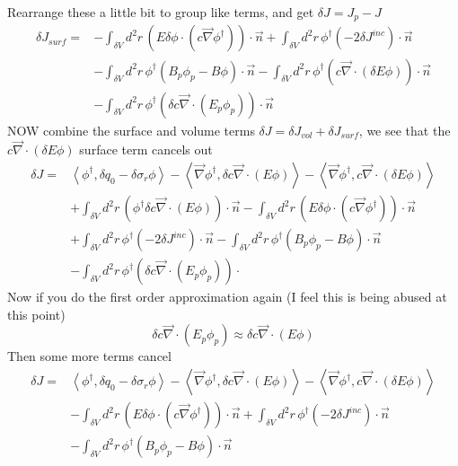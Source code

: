 \documentclass{article}
\newcommand{\bra}{\left\langle}
\newcommand{\ket}{\right\rangle}
\newcommand{\vdiv}{\vec{\nabla} \cdot}
\newcommand{\vgrad}{\vec{\nabla}}
\begin{document}
Rearrange these a little bit to group like terms, and get $\delta J = J_p -J$
\begin{align*}
\delta J_{surf} =& - \int_{\delta V} d^2 r \, \left( E \delta \phi \cdot \left( c  \vgrad \phi^\dag \right)\right) \cdot \vec{n} + \int_{\delta V} d^2 r \, \phi^\dag \left(-2\delta J^{inc} \right) \cdot \vec{n} \\
&- \int_{\delta V} d^2 r \, \phi^\dag \left( B_p \phi_p - B \phi \right) \cdot \vec{n} - \int_{\delta V} d^2 r \, \phi^\dag \left( c \vdiv \left( \delta E \phi \right) \right) \cdot \vec{n} \\
&- \int_{\delta V} d^2 r \, \phi^\dag \left( \delta c \vdiv \left( E_p \phi_p \right) \right) \cdot \vec{n}
\end{align*}
NOW combine the surface and volume terms $\delta J = \delta J_{vol} + \delta J_{surf}$, we see that the $c \vdiv \left( \delta E \phi \right)$ surface term cancels out
\begin{align*}
\delta J =& \bra \phi^\dag , \delta q_0 - \delta \sigma_r \phi \ket -  \bra \vgrad \phi^\dag ,  \delta c \vdiv \left( E \phi  \right) \ket - \bra \vgrad \phi^\dag ,  c \vdiv \left( \delta E \phi \right)   \ket \\
&+ \int_{\delta V} d^2 r \, \left( \phi^\dag \delta c \vdiv \left( E \phi \right) \right) \cdot \vec{n} 
- \int_{\delta V} d^2 r \, \left( E \delta \phi \cdot \left( c  \vgrad \phi^\dag \right)\right) \cdot \vec{n} \\
&+ \int_{\delta V} d^2 r \, \phi^\dag \left(-2\delta J^{inc} \right) \cdot \vec{n} 
- \int_{\delta V} d^2 r \, \phi^\dag \left( B_p \phi_p - B \phi \right) \cdot \vec{n}  \\
&- \int_{\delta V} d^2 r \, \phi^\dag \left( \delta c \vdiv \left( E_p \phi_p \right) \right) \cdot
\end{align*}
Now if you do the first order approximation again (I feel this is being abused at this point)
\[
\delta c \vdiv \left( E_p \phi_p \right) \approx \delta c \vdiv \left( E \phi \right)
\]
Then some more terms cancel
\begin{align*}
\delta J =& \bra \phi^\dag , \delta q_0 - \delta \sigma_r \phi \ket -  \bra \vgrad \phi^\dag ,  \delta c \vdiv \left( E \phi  \right) \ket - \bra \vgrad \phi^\dag ,  c \vdiv \left( \delta E \phi \right)   \ket \\
&- \int_{\delta V} d^2 r \, \left( E \delta \phi \cdot \left( c  \vgrad \phi^\dag \right)\right) \cdot \vec{n} 
+ \int_{\delta V} d^2 r \, \phi^\dag \left(-2\delta J^{inc} \right) \cdot \vec{n} \\
&- \int_{\delta V} d^2 r \, \phi^\dag \left( B_p \phi_p - B \phi \right) \cdot \vec{n}  
\end{align*}
\end{document}
